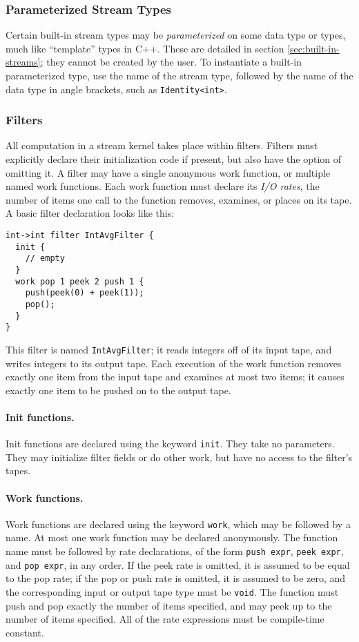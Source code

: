 \documentclass[11pt]{article}
\begin{document}
\subsubsection{Parameterized Stream Types}

Certain built-in stream types may be \emph{parameterized} on some data
type or types, much like ``template'' types in C++.  These are
detailed in section \ref{sec:built-in-streams}; they cannot be created
by the user.  To instantiate a built-in parameterized type, use the
name of the stream type, followed by the name of the data type in
angle brackets, such as \texttt{Identity<int>}.

\subsubsection{Filters}

All computation in a stream kernel takes place within filters.
Filters must explicitly declare their initialization code if present,
but also have the option of omitting it.  A filter may have a single
anonymous work function, or multiple named work functions.  Each work
function must declare its \emph{I/O rates}, the number of items one
call to the function removes, examines, or places on its tape.  A
basic filter declaration looks like this:

\begin{verbatim}
int->int filter IntAvgFilter {
  init {
    // empty
  }
  work pop 1 peek 2 push 1 {
    push(peek(0) + peek(1));
    pop();
  }
}
\end{verbatim}

This filter is named \texttt{IntAvgFilter}; it reads integers off of its
input tape, and writes integers to its output tape.  Each execution of
the work function removes exactly one item from the input tape and
examines at most two items; it causes exactly one item to be pushed on
to the output tape.

\paragraph{Init functions.}  Init functions are declared using the
keyword \texttt{init}.  They take no parameters.  They may initialize
filter fields or do other work, but have no access to the filter's
tapes.

\paragraph{Work functions.}  Work functions are declared using the
keyword \texttt{work}, which may be followed by a name.  At most
one work function may be declared anonymously.  The function name must
be followed by rate declarations, of the form \texttt{push expr},
\texttt{peek expr}, and \texttt{pop expr}, in any order.  If the
peek rate is omitted, it is assumed to be equal to the pop rate; if
the pop or push rate is omitted, it is assumed to be zero, and the
corresponding input or output tape type must be \texttt{void}.  The
function must push and pop exactly the number of items specified, and
may peek up to the number of items specified.  All of the rate
expressions must be compile-time constant.
\end{document}
